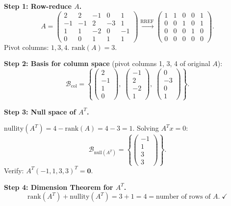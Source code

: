 \documentclass[12pt,a3paper]{article}
\begin{document}
\begin{tcolorbox}[enhanced,breakable,
  colback=cC!4,colframe=cC,boxrule=0.8pt,arc=5pt,
  title={\textbf{Answer --- Column Space, $\mathrm{null}(A^T)$ \& Dimension Theorem}},
  fonttitle=\bfseries\color{white},colbacktitle=cC]

\textbf{Step 1: Row-reduce $A$.}
\[
A=\begin{pmatrix}2&2&-1&0&1\\-1&-1&2&-3&1\\1&1&-2&0&-1\\0&0&1&1&1\end{pmatrix}
\xrightarrow{\text{RREF}}
\begin{pmatrix}1&1&0&0&1\\0&0&1&0&1\\0&0&0&1&0\\0&0&0&0&0\end{pmatrix}.
\]
Pivot columns: $1, 3, 4$. \quad $\mathrm{rank}(A)=3$.

\medskip
\textbf{Step 2: Basis for column space} (pivot columns 1, 3, 4 of original $A$):
\[
\boxed{\mathcal{B}_{\mathrm{col}}=\left\{
\begin{pmatrix}2\\-1\\1\\0\end{pmatrix},\;
\begin{pmatrix}-1\\2\\-2\\1\end{pmatrix},\;
\begin{pmatrix}0\\-3\\0\\1\end{pmatrix}
\right\}}.
\]

\medskip
\textbf{Step 3: Null space of $A^T$.}

$\mathrm{nullity}(A^T)=4-\mathrm{rank}(A)=4-3=1$. Solving $A^Tx=0$:
\[
\mathcal{B}_{\mathrm{null}(A^T)}=\left\{\begin{pmatrix}-1\\1\\3\\3\end{pmatrix}\right\}.
\]
Verify: $A^T(-1,1,3,3)^T=\mathbf{0}$.\;\checkmark

\medskip
\textbf{Step 4: Dimension Theorem for $A^T$.}
\[
\mathrm{rank}(A^T)+\mathrm{nullity}(A^T)=3+1=4=\text{number of rows of }A.\;\checkmark
\]

\end{tcolorbox}
\end{document}

